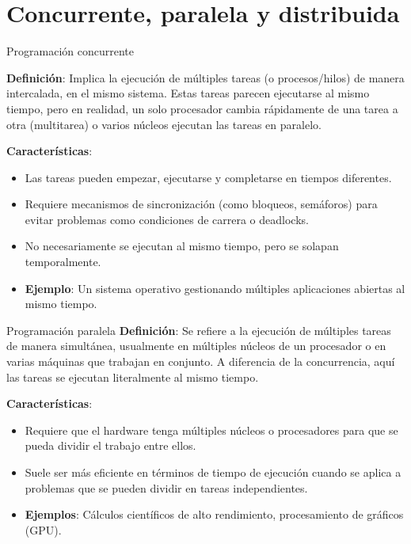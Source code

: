 \documentclass{beamer}
\begin{document}
\section{Concurrente, paralela y distribuida}


\begin{frame}{Programación concurrente}

\textbf{Definición}: Implica la ejecución de múltiples tareas (o procesos/hilos) de manera intercalada, en el mismo sistema. Estas tareas parecen ejecutarse al mismo tiempo, pero en realidad, un solo procesador cambia rápidamente de una tarea a otra (multitarea) o varios núcleos ejecutan las tareas en paralelo.

\textbf{Características}:
    \begin{itemize}
        \item Las tareas pueden empezar, ejecutarse y completarse en tiempos diferentes.
        \item Requiere mecanismos de sincronización (como bloqueos, semáforos) para evitar problemas como condiciones de carrera o deadlocks.
        \item No necesariamente se ejecutan al mismo tiempo, pero se solapan temporalmente.
        \item \textbf{Ejemplo}: Un sistema operativo gestionando múltiples aplicaciones abiertas al mismo tiempo.
    \end{itemize}
\end{frame}

\begin{frame}{Programación paralela}
\textbf{Definición}: Se refiere a la ejecución de múltiples tareas de manera simultánea, usualmente en múltiples núcleos de un procesador o en varias máquinas que trabajan en conjunto. A diferencia de la concurrencia, aquí las tareas se ejecutan literalmente al mismo tiempo.

\textbf{Características}:
\begin{itemize}
    \item Requiere que el hardware tenga múltiples núcleos o procesadores para que se pueda dividir el trabajo entre ellos.
    \item Suele ser más eficiente en términos de tiempo de ejecución cuando se aplica a problemas que se pueden dividir en tareas independientes.
    \item \textbf{Ejemplos}: Cálculos científicos de alto rendimiento, procesamiento de gráficos (GPU).
\end{itemize}
\end{frame}
\end{document}
